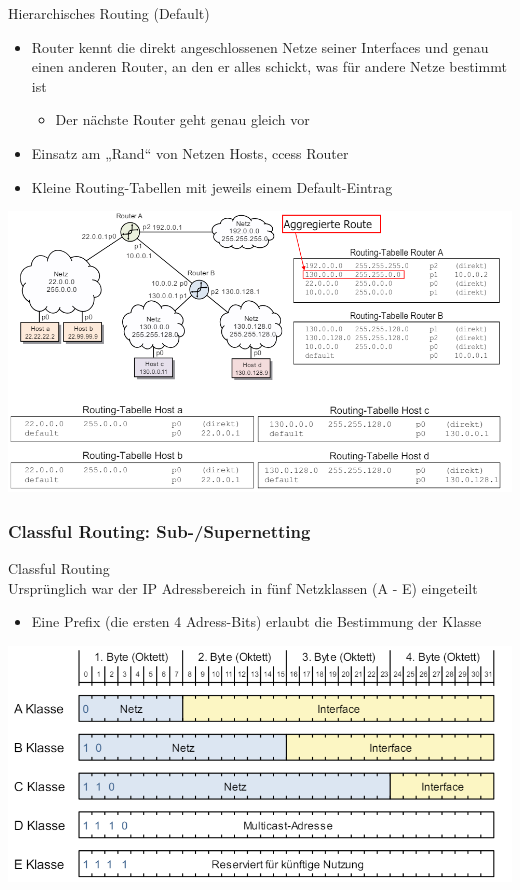\begin{concept}{Hierarchisches Routing (Default)}
    \begin{itemize}
        \item Router kennt die direkt angeschlossenen Netze seiner Interfaces und genau einen anderen Router, an den er alles schickt, was für andere Netze bestimmt ist
        \begin{itemize}
            \item Der nächste Router geht genau gleich vor
        \end{itemize}
        \item Einsatz am „Rand“ von Netzen Hosts, ccess Router
        \item Kleine Routing-Tabellen mit jeweils einem Default-Eintrag
    \end{itemize}
        \includegraphics[width=1\linewidth]{images/hierarchisches_routing.png}
\end{concept}

\subsubsection{Classful Routing: Sub-/Supernetting}

\begin{concept}{Classful Routing}\\
    Ursprünglich war der IP Adressbereich in fünf Netzklassen (A - E) eingeteilt
    \begin{itemize}
        \item Eine Prefix (die ersten 4 Adress-Bits) erlaubt die Bestimmung der Klasse
    \end{itemize}
        \includegraphics[width=1\linewidth]{images/classfulrouitng.png}
\end{concept}

